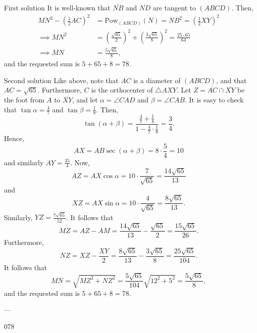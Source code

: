 \begin{customenv}{First solution}
    It is well-known that $\overline{NB}$ and $\overline{ND}$ are tangent to $(ABCD)$. Then,
    \begin{align*}
        MN^2-\left(\frac12AC\right)^2&=\text{Pow}_{(ABCD)}(N)=NB^2=\left(\frac12XY\right)^2\\
        \implies MN^2&=\left(\frac{\sqrt{65}}2\right)^2+\left(\frac{3\sqrt{65}}8\right)^2=\frac{25\cdot 65}{64}\\
        \implies MN&=\frac{5\sqrt{65}}8,
    \end{align*}
    and the requested sum is $5+65+8=78$.
\end{customenv}
\begin{customenv}{Second solution}
    Like above, note that $\overline{AC}$ is a diameter of $(ABCD)$, and that $AC=\sqrt{65}$. Furthermore, $C$ is the orthocenter of $\triangle AXY$. Let $Z=\overline{AC}\cap\overline{XY}$ be the foot from $A$ to $\overline{XY}$, and let $\alpha=\angle CAD$ and $\beta=\angle CAB$. It is easy to check that $\tan\alpha=\tfrac47$ and $\tan\beta=\tfrac18$. Then, \[\tan(\alpha+\beta)=\frac{\tfrac47+\tfrac18}{1-\tfrac47\cdot\tfrac18}=\frac34.\]
    Hence, \[AX=AB\sec(\alpha+\beta)=8\cdot\frac54=10\]
    and similarly $AY=\frac{35}4$. Now, \[AZ=AX\cos\alpha=10\cdot\frac7{\sqrt{65}}=\frac{14\sqrt{65}}{13}\]
    and \[XZ=AX\sin\alpha=10\cdot\frac4{\sqrt{65}}=\frac{8\sqrt{65}}{13}.\]
    Similarly, $YZ=\tfrac{7\sqrt{65}}{52}$. It follows that \[MZ=AZ-AM=\frac{14\sqrt{65}}{13}-\frac{\sqrt{65}}2=\frac{15\sqrt{65}}{26}.\]
    Furthermore, \[NZ=XZ-\frac{XY}2=\frac{8\sqrt{65}}{13}-\frac{3\sqrt{65}}8=\frac{25\sqrt{65}}{104}.\]
    It follows that \[MN=\sqrt{MZ^2+NZ^2}=\frac{5\sqrt{65}}{104}\sqrt{12^2+5^2}=\frac{5\sqrt{65}}8,\]
    and the requested sum is $5+65+8=78$.
\end{customenv}

---

078
